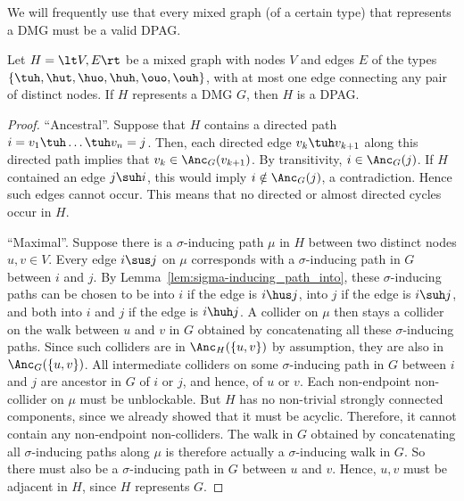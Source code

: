 We will frequently use that every mixed graph (of a certain type) that represents a DMG must be a valid DPAG.
\begin{Prp}\label{prp:dpag_represents_dmg_is_valid}
Let $H = \lt V,E\rt$ be a mixed graph with nodes $V$ and edges $E$ of the types $\{\tuh,\hut,\huo,\huh,\ouo,\ouh\}$, with at most one edge connecting any pair of distinct nodes.
If $H$ represents a DMG $G$, then $H$ is a DPAG.
\end{Prp}
\begin{proof}
  ``Ancestral''. Suppose that $H$ contains a directed path $i = v_1 \tuh \dots \tuh v_n = j$.
  Then, each directed edge $v_k \tuh v_{k+1}$ along this directed path implies that $v_k \in \Anc_G(v_{k+1})$. 
  By transitivity, $i \in \Anc_G(j)$. 
  If $H$ contained an edge $j \suh i$, this would imply $i \notin \Anc_G(j)$, a contradiction. 
  Hence such edges cannot occur.
  This means that no directed or almost directed cycles occur in $H$.

  ``Maximal''.
  Suppose there is a $\sigma$-inducing path $\mu$ in $H$ between two distinct nodes $u,v \in V$. 
  Every edge $i \sus j$ on $\mu$ corresponds with a $\sigma$-inducing path in $G$ between $i$ and $j$.
  By Lemma~\ref{lem:sigma-inducing_path_into}, these $\sigma$-inducing paths can be chosen to be into $i$ if the edge is $i \hus j$, into $j$ if the edge is $i \suh j$, and both into $i$ and $j$ if the edge is $i \huh j$. 
  A collider on $\mu$ then stays a collider on the walk between $u$ and $v$ in $G$ obtained by concatenating all these $\sigma$-inducing paths.
  Since such colliders are in $\Anc_H(\{u,v\})$ by assumption, they are also in $\Anc_G(\{u,v\})$.
  All intermediate colliders on some $\sigma$-inducing path in $G$ between $i$ and $j$ are ancestor in $G$ of $i$ or $j$, and
  hence, of $u$ or $v$.
  Each non-endpoint non-collider on $\mu$ must be unblockable.
  But $H$ has no non-trivial strongly connected components, since we already showed that it must be acyclic.
  Therefore, it cannot contain any non-endpoint non-colliders.
  The walk in $G$ obtained by concatenating all $\sigma$-inducing paths along $\mu$ is therefore actually a $\sigma$-inducing walk in $G$.
  So there must also be a $\sigma$-inducing path in $G$ between $u$ and $v$.
  Hence, $u,v$ must be adjacent in $H$, since $H$ represents $G$.
\end{proof}

